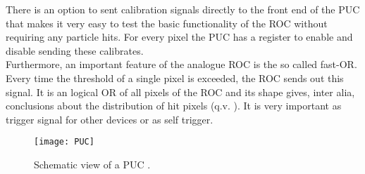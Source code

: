 There is an option to sent calibration signals directly to the front end of the \ac{PUC} that makes it very easy to test the basic functionality of the \ac{ROC} without requiring any particle hits. For every pixel the \ac{PUC} has a register to enable and disable sending these calibrates.\\
Furthermore, an important feature of the analogue \ac{ROC} is the so called fast-OR. Every time the threshold of a single pixel is exceeded, the \ac{ROC} sends out this signal. It is an logical OR of all pixels of the \ac{ROC} and its shape gives, inter alia, conclusions about the distribution of hit pixels (q.v. ). It is very important as trigger signal for other devices or as self trigger.
\begin{figure}[ht]
	\texttt{[image: PUC]}
	\caption{Schematic view of a \ac{PUC} \cite{dambach}.}
	\label{p9}
\end{figure}
